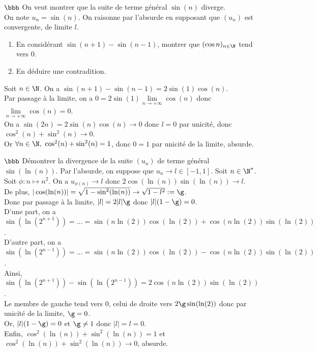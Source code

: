\documentclass[11pt]{article}
\begin{document}
\vspace*{-0.2cm}

\begin{exercice}{$\bbb$}{}
    On veut montrer que la suite de terme général $\sin(n)$ diverge.\\
    On note $u_n=\sin(n)$. On raisonne par l'absurde en supposant que $(u_n)$ est convergente, de limite $l$.
    \begin{enumerate}
        \item En considérant $\sin(n+1) - \sin(n-1)$, montrer que $(\cos n)_{n\in\N}$ tend vers 0.
        \item En déduire une contradition.
    \end{enumerate}
    \tcblower
     Soit $n\in\N$. On a $\sin(n+1)-\sin(n-1)=2\sin(1)\cos(n)$.\\
    Par passage à la limite, on a $0=2\sin(1)\lim\limits_{n\to+\infty}\cos(n)$ donc $\lim\limits_{n\to+\infty}\cos(n)=0$.\\
     On a $\sin(2n)=2\sin(n)\cos(n)\to0$ donc $l=0$ par unicité, donc $\cos^2(n)+\sin^2(n)\to0$.\\
    Or $\forall n \in \N, ~ \cos^2(n) + \sin^2(n) = 1$, donc $0=1$ par unicité de la limite, absurde.
\end{exercice}

\vspace*{-0.2cm}

\begin{exercice}{$\bbb$}{}
    Démontrer la divergence de la suite $(u_n)$ de terme général $\sin(\ln(n))$.
    \tcblower
    Par l'absurde, on suppose que $u_n\to l\in[-1,1]$. Soit $n\in\N^*$.\\
    Soit $\phi:n\mapsto n^2$. On a $u_{\phi(n)}\to l$ donc $2\cos(\ln(n))\sin(\ln(n))\to l$.\\
    De plus, $|\cos(\ln(n))|=\sqrt{1-\sin^2(\ln(n))}\to\sqrt{1-l^2}:=\g$.\\
    Donc par passage à la limite, $|l|=2|l|\g$ donc $|l|(1-\g)=0$.\\
    D'une part, on a $\sin(\ln(2^{n+1}))=...=\sin(n\ln(2))\cos(\ln(2))+\cos(n\ln(2))\sin(\ln(2))$.\\
    D'autre part, on a $\sin(\ln(2^{n-1}))=...=\sin(n\ln(2))\cos(\ln(2))-\cos(n\ln(2))\sin(\ln(2))$.\\
    Ainsi, $\sin(\ln(2^{n+1}))-\sin(\ln(2^{n-1}))=2\cos(n\ln(2))\sin(\ln(2))$.\\
    Le membre de gauche tend vers 0, celui de droite vers $2\g\sin(\ln(2))$ donc par unicité de la limite, $\g=0$.\\
    Or, $|l|(1-\g)=0$ et $\g\neq 1$ donc $|l|=l=0$.\\
    Enfin, $\cos^2(\ln(n))+\sin^2(\ln(n))=1$ et $\cos^2(\ln(n))+\sin^2(\ln(n))\to 0$, absurde.
\end{exercice}
\end{document}
